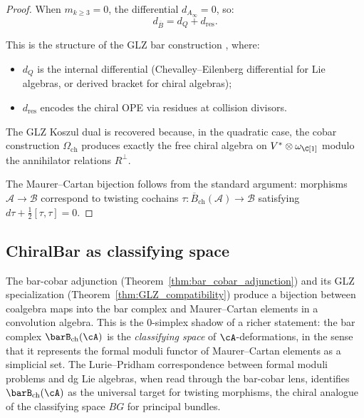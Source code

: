 \begin{proof}
When $m_{k \geq 3} = 0$, the differential $d_{A_\infty} = 0$, so:
\begin{equation}
d_{\overline{B}} = d_Q + d_{\text{res}}.
\end{equation}

This is the structure of the GLZ bar construction \cite{GLZ22}, where:
\begin{itemize}
\item $d_Q$ is the internal differential (Chevalley--Eilenberg differential for Lie algebras, or derived bracket for chiral algebras);
\item $d_{\text{res}}$ encodes the chiral OPE via residues at collision divisors.
\end{itemize}

The GLZ Koszul dual is recovered because, in the quadratic case, the cobar construction $\Omega_{\text{ch}}$ produces exactly the free chiral algebra on $V^* \otimes \omega_\C[1]$ modulo the annihilator relations $R^\perp$.

The Maurer--Cartan bijection follows from the standard argument: morphisms $\mathcal{A} \to \mathcal{B}$ correspond to twisting cochains $\tau : \overline{B}_{\text{ch}}(\mathcal{A}) \to \mathcal{B}$ satisfying $d\tau + \frac{1}{2}[\tau, \tau] = 0$.
\end{proof}

\subsection{ChiralBar as classifying space}
\label{subsec:chiralbar-classifying-space}

The bar-cobar adjunction (Theorem~\ref{thm:bar_cobar_adjunction})
and its GLZ specialization (Theorem~\ref{thm:GLZ_compatibility})
produce a bijection between coalgebra maps into the bar complex
and Maurer--Cartan elements in a convolution algebra. This is
the $0$-simplex shadow of a richer statement: the bar complex
$\barB_{\mathrm{ch}}(\cA)$ is the \emph{classifying space} of
$\cA$-deformations, in the sense that it represents the formal
moduli functor of Maurer--Cartan elements as a simplicial set.
The Lurie--Pridham correspondence between formal moduli problems
and dg Lie algebras, when read through the bar-cobar lens,
identifies $\barB_{\mathrm{ch}}(\cA)$ as the universal target
for twisting morphisms, the chiral analogue of the classifying
space $BG$ for principal bundles.

